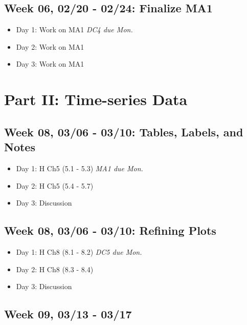 \documentclass[11pt,]{article}
\begin{document}
\hypertarget{week-06-0220---0224-finalize-ma1}{%
\subsection{Week 06, 02/20 - 02/24: Finalize
MA1}\label{week-06-0220---0224-finalize-ma1}}

\begin{itemize}
\item
  Day 1: Work on MA1 \hfill \textit{DC4 due Mon.}
\item
  Day 2: Work on MA1
\item
  Day 3: Work on MA1
\end{itemize}

\hypertarget{part-ii-time-series-data}{%
\section{Part II: Time-series Data}\label{part-ii-time-series-data}}

\hypertarget{week-08-0306---0310-tables-labels-and-notes}{%
\subsection{Week 08, 03/06 - 03/10: Tables, Labels, and
Notes}\label{week-08-0306---0310-tables-labels-and-notes}}

\begin{itemize}
\item
  Day 1: H Ch5 (5.1 - 5.3) \hfill \textit{MA1 due Mon.}
\item
  Day 2: H Ch5 (5.4 - 5.7)
\item
  Day 3: Discussion
\end{itemize}

\hypertarget{week-08-0306---0310-refining-plots}{%
\subsection{Week 08, 03/06 - 03/10: Refining
Plots}\label{week-08-0306---0310-refining-plots}}

\begin{itemize}
\item
  Day 1: H Ch8 (8.1 - 8.2) \hfill \textit{DC5 due Mon.}
\item
  Day 2: H Ch8 (8.3 - 8.4)
\item
  Day 3: Discussion
\end{itemize}

\hypertarget{week-09-0313---0317}{%
\subsection{Week 09, 03/13 - 03/17}\label{week-09-0313---0317}}
\end{document}
